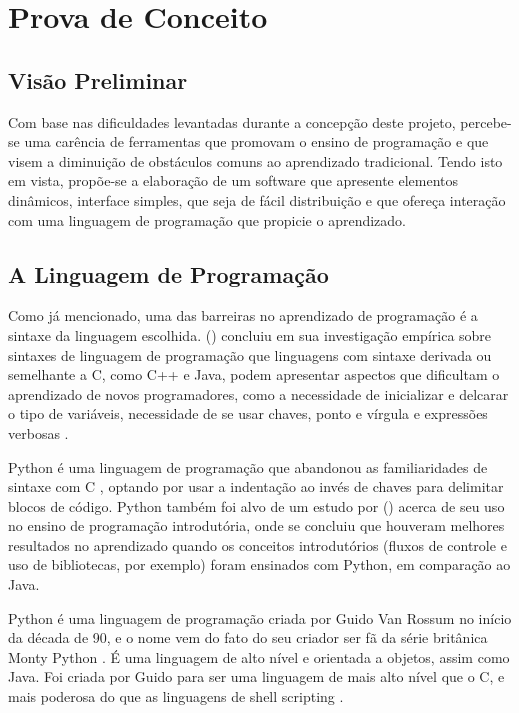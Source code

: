 \chapter[Prova de Conceito]{Prova de Conceito}

\section{Visão Preliminar}

Com base nas dificuldades levantadas durante a concepção deste projeto, percebe-se uma carência de ferramentas que promovam o ensino de programação e que visem a diminuição de obstáculos comuns ao aprendizado tradicional. Tendo isto em vista, propõe-se a elaboração de um software que apresente elementos dinâmicos, interface simples, que seja de fácil distribuição e que ofereça interação com uma linguagem de programação que propicie o aprendizado.

\section{A Linguagem de Programação}

Como já mencionado, uma das barreiras no aprendizado de programação é a sintaxe da linguagem escolhida. \citeauthor{stefik2013} (\citeyear{stefik2013}) concluiu em sua investigação empírica sobre sintaxes de linguagem de programação que linguagens com sintaxe derivada ou semelhante a C, como C++ e Java, podem apresentar aspectos que dificultam o aprendizado de novos programadores, como a necessidade de inicializar e delcarar o tipo de variáveis, necessidade de se usar chaves, ponto e vírgula e expressões verbosas \cite{mannila2006}.

Python é uma linguagem de programação que abandonou as familiaridades de sintaxe com C \cite{stefik2013}, optando por usar a indentação ao invés de chaves para delimitar blocos de código. Python também foi alvo de um estudo por \citeauthor{jayal2015} (\citeyear{jayal2015}) acerca de seu uso no ensino de programação introdutória, onde se concluiu que houveram melhores resultados no aprendizado quando os conceitos introdutórios (fluxos de controle e uso de bibliotecas, por exemplo) foram ensinados com Python, em comparação ao Java.

Python é uma linguagem de programação criada por Guido Van Rossum no início da década de 90, e o nome vem do fato do seu criador ser fã da série britânica Monty Python \cite{moraispires2002}. É uma linguagem de alto nível e orientada a objetos, assim como Java. Foi criada por Guido para ser uma linguagem de mais alto nível que o C, e mais poderosa do que as linguagens de shell scripting \cite{moraispires2002}.

